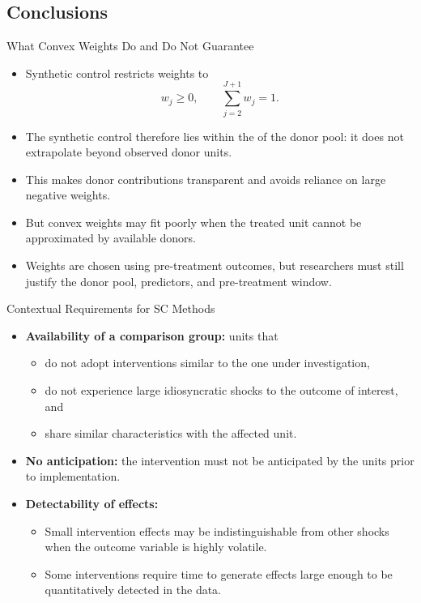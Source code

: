 \documentclass[11pt,aspectratio=169]{beamer}
\begin{document}
\subsection{Conclusions}

\begin{frame}{What Convex Weights Do and Do Not Guarantee}
\begin{itemize}
  \item Synthetic control restricts weights to
  \[w_j\ge0,\qquad\sum_{j=2}^{J+1}w_j=1.\]
  \item The synthetic control therefore lies within the  of the donor pool: it does not extrapolate beyond observed donor units.
  \item This makes donor contributions transparent and avoids reliance on large negative weights.
  \item But convex weights may fit poorly when the treated unit cannot be approximated by available donors.
  \item Weights are chosen using pre-treatment outcomes, but researchers must still justify the donor pool, predictors, and pre-treatment window.
\end{itemize}
\end{frame}

\begin{frame}{Contextual Requirements for SC Methods}
\small
\begin{itemize}
  \item \textbf{Availability of a comparison group:} units that
  \begin{itemize}
    \item do not adopt interventions similar to the one under investigation,
    \item do not experience large idiosyncratic shocks to the outcome of interest, and
    \item share similar characteristics with the affected unit.
  \end{itemize}
  \item \textbf{No anticipation:} the intervention must not be anticipated by the units prior to implementation.
  \item \textbf{Detectability of effects:}
  \begin{itemize}
    \item Small intervention effects may be indistinguishable from other shocks when the outcome variable is highly volatile.
    \item Some interventions require time to generate effects large enough to be quantitatively detected in the data.
  \end{itemize}
\end{itemize}
\end{frame}
\end{document}
